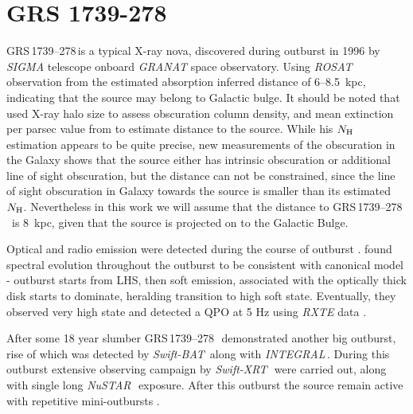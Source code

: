 \documentclass[a4paper,fleqn,usenatbib]{mnras}
\def\grs{{GRS\,1739--278\,}}
\def\swiftx{{\em Swift-XRT\,}}
\def\swiftb{{\em Swift-BAT\,}}
\def\nustar{{\em NuSTAR\,}}
\def\integral{{\em INTEGRAL\,}}
\begin{document}
\section{GRS 1739-278}

\grs is a typical X-ray nova, discovered during outburst in 1996  \citep{paul96} by {\it SIGMA} \citep{paul91} telescope onboard {\it GRANAT} space observatory.
Using {\it ROSAT} observation from the estimated absorption \citet{greiner96} inferred distance of 6--8.5~kpc, indicating that the source may belong to Galactic bulge. 
It should be noted that \citet{greiner96} used X-ray halo size to assess obscuration column density, and mean extinction per parsec value from \citep{1973asqu.book.....A} to estimate distance to the source. 
While his $N_{\rm H}$ estimation appears to be quite precise, new measurements of the obscuration in the Galaxy \citep{1990ARA&A..28..215D, 2005A&A...440..775K, 2006A&A...453..635M, 2014A&A...566A.120S} shows that the source either has intrinsic obscuration or additional line of sight obscuration, but the distance can not be constrained, since the line of sight obscuration in Galaxy towards the source is smaller than its estimated $N_{\rm H}$.
Nevertheless in this work we will assume that the distance to \grs\ is 8~kpc, given that the source is projected on to the Galactic Bulge.  

Optical and radio emission were detected during the course of outburst \citep{hjellming96,marti97}. 
\citet{borozdin98} found spectral evolution throughout the outburst to be consistent with canonical model - outburst starts from LHS, then soft emission, associated with the optically thick disk starts to dominate, heralding transition to high soft state. 
Eventually, they observed very high state and detected a QPO at 5 Hz using {\it RXTE} data \citep{borozdin00, 2001MNRAS.328..451W}.

After some 18 year slumber \grs\ demonstrated another big outburst, rise of which was detected by \swiftb \citep{krimm14_atel} along with \integral \citep{filippova14}. 
During this outburst extensive observing campaign by \swiftx\, were carried out, along with single long \nustar\ exposure. 
After this outburst the source remain active with repetitive mini-outbursts \citep{mereminskiy17grs,yan17}.
\end{document}
